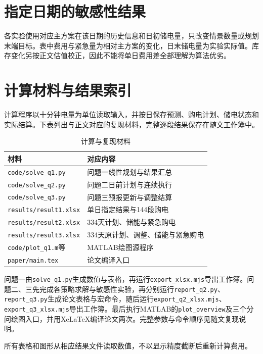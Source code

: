 \section{指定日期的敏感性结果}\label{app:sensitivity}
各实验使用对应主方案在该日期的历史信息和日初储电量，只改变情景数量或规划末端目标。表中费用与紧急量为相对主方案的变化，日末储电量为实验实际值。库存变化另按正文估值校正，因此不能将单日费用差全部理解为算法优劣。
\begin{table}[htbp]\centering\scriptsize
\caption{问题二的同起点敏感性比较}\label{tab:q2sensitivity}
\resizebox{\textwidth}{!}{}
\end{table}
\begin{table}[htbp]\centering\scriptsize
\caption{问题三的同起点敏感性比较}\label{tab:q3sensitivity}
\resizebox{\textwidth}{!}{}
\end{table}

\clearpage
\section{计算材料与结果索引}
计算程序以十分钟电量为单位读取输入，并按日保存预测、购电计划、储电状态和实际结算。下表列出与正文对应的复现材料，完整逐段结果保存在随文工作簿中。
\begin{table}[htbp]\centering\small
\caption{计算与复现材料}
\begin{tabular}{ll}\toprule
材料 & 对应内容\\\midrule
\texttt{code/solve\_q1.py} & 问题一线性规划与结果汇总\\
\texttt{code/solve\_q2.py} & 问题二日前计划与连续执行\\
\texttt{code/solve\_q3.py} & 问题三预报更新与调整结算\\
\texttt{results/result1.xlsx} & 单日指定结果与144段购电\\
\texttt{results/result2.xlsx} & 334天计划、储能与紧急购电\\
\texttt{results/result3.xlsx} & 334天原计划、调整、储能与紧急购电\\
\texttt{code/plot\_q1.m}等 & MATLAB绘图源程序\\
\texttt{paper/main.tex} & 论文编译入口\\
\bottomrule\end{tabular}
\end{table}
问题一由\texttt{solve\_q1.py}生成数值与表格，再运行\texttt{export\_xlsx.mjs}导出工作簿。问题二、三先完成各策略求解与敏感性实验，再分别运行\texttt{report\_q2.py}、\texttt{report\_q3.py}生成论文表格与宏命令，随后运行\texttt{export\_q2\_xlsx.mjs}、\texttt{export\_q3\_xlsx.mjs}导出工作簿。最后执行MATLAB的\texttt{plot\_overview}及三个分问绘图入口，并用XeLaTeX编译论文两次。完整参数与命令顺序见随文复现说明。

所有表格和图形从相应结果文件读取数值，不以显示精度截断后重新计算费用。
